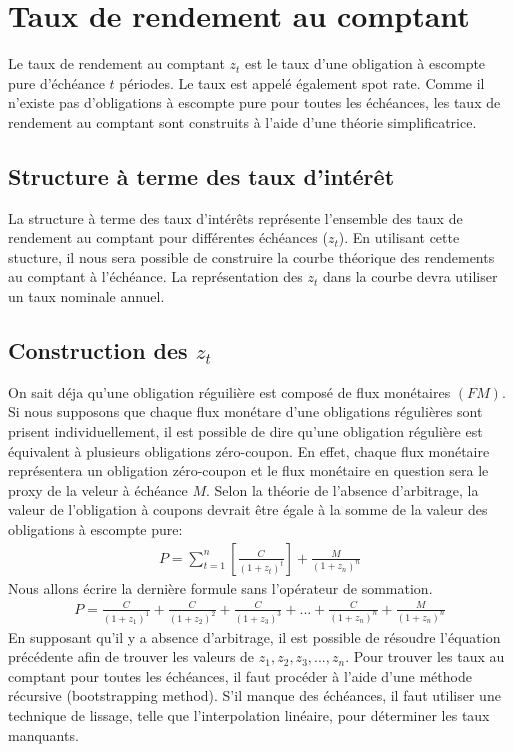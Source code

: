 \documentclass[letterpaper, 12pt]{article}
\newcommand{\1}{\mathds{1}}	%
\theoremstyle{definition}
\begin{document}
\section{Taux de rendement au comptant}
Le taux de rendement au comptant $z_t$ est le taux d’une obligation à escompte pure d’échéance $t$ périodes.  Le taux est appelé également spot rate.  Comme il n’existe pas d’obligations à escompte pure pour toutes les échéances,  les taux de rendement au comptant sont construits à l’aide d’une théorie simplificatrice.
\subsection{Structure à terme des taux d’intérêt}
La structure à terme des taux d'intérêts représente l'ensemble des taux de rendement au comptant pour différentes échéances ($z_t$).  En utilisant cette stucture,  il nous sera possible de construire la courbe théorique des rendements au comptant à l’échéance.  La représentation des $z_t$ dans la courbe devra utiliser un taux nominale annuel.
\newpage
\subsection{Construction des $z_t$}
On sait déja qu'une obligation réguilière est composé de flux monétaires $(FM)$.  Si nous supposons que chaque flux monétare d'une obligations régulières sont prisent individuellement,  il est possible de dire qu'une obligation régulière est équivalent à plusieurs obligations zéro-coupon. En effet,  chaque flux monétaire représentera un obligation zéro-coupon et le flux monétaire en question sera le proxy de la veleur à échéance $M$.  Selon la théorie de l’absence d’arbitrage, la valeur de l’obligation à coupons devrait être égale à la somme de la valeur des obligations à escompte pure:
\begin{align*}
P=\sum_{t=1}^n \left[ \frac{C}{(1+z_t)^t} \right]+\frac{M}{(1+z_n)^{n}}
\end{align*}
Nous allons écrire la dernière formule sans l'opérateur de sommation.
\begin{align*}
P=\frac{C}{(1+z_1)^1}+\frac{C}{(1+z_2)^2}+\frac{C}{(1+z_3)^3}+...+\frac{C}{(1+z_n)^n}+\frac{M}{(1+z_n)^{n}}
\end{align*}
En supposant qu’il y a absence d’arbitrage,  il est possible de résoudre l’équation précédente afin de trouver les valeurs de $z_1, z_2, z_3,...,z_n$.  Pour trouver les taux au comptant pour toutes les échéances,  il faut procéder à l’aide d’une méthode récursive (bootstrapping method).  S’il manque des échéances, il faut utiliser une technique de lissage, telle que l’interpolation linéaire, pour déterminer les taux manquants.
\end{document}
